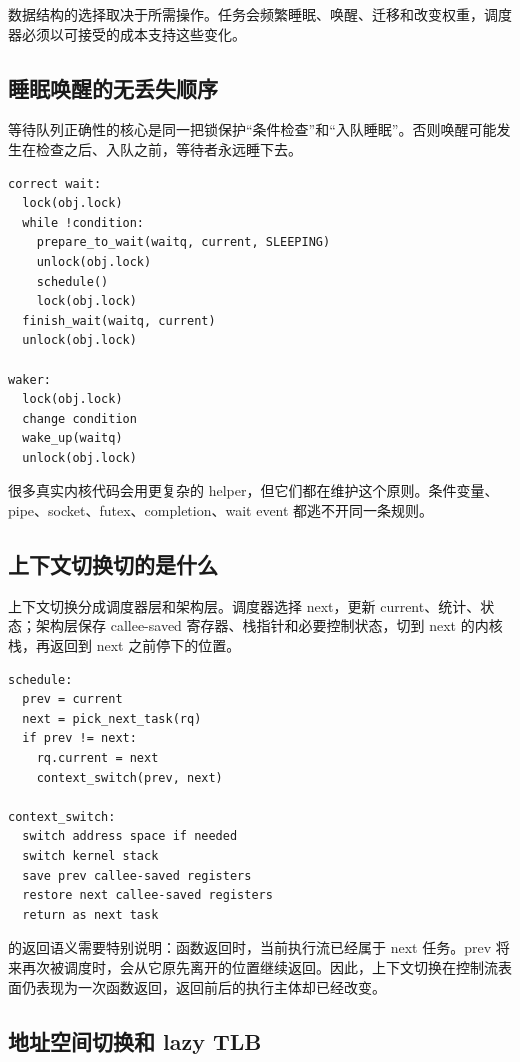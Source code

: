 数据结构的选择取决于所需操作。任务会频繁睡眠、唤醒、迁移和改变权重，调度器必须以可接受的成本支持这些变化。

\subsection{睡眠唤醒的无丢失顺序}

等待队列正确性的核心是同一把锁保护“条件检查”和“入队睡眠”。否则唤醒可能发生在检查之后、入队之前，等待者永远睡下去。

\begin{lstlisting}
correct wait:
  lock(obj.lock)
  while !condition:
    prepare_to_wait(waitq, current, SLEEPING)
    unlock(obj.lock)
    schedule()
    lock(obj.lock)
  finish_wait(waitq, current)
  unlock(obj.lock)

waker:
  lock(obj.lock)
  change condition
  wake_up(waitq)
  unlock(obj.lock)
\end{lstlisting}

很多真实内核代码会用更复杂的 helper，但它们都在维护这个原则。条件变量、pipe、socket、futex、completion、wait event 都逃不开同一条规则。

\subsection{上下文切换切的是什么}

上下文切换分成调度器层和架构层。调度器选择 next，更新 current、统计、状态；架构层保存 callee-saved 寄存器、栈指针和必要控制状态，切到 next 的内核栈，再返回到 next 之前停下的位置。

\begin{lstlisting}
schedule:
  prev = current
  next = pick_next_task(rq)
  if prev != next:
    rq.current = next
    context_switch(prev, next)

context_switch:
  switch address space if needed
  switch kernel stack
  save prev callee-saved registers
  restore next callee-saved registers
  return as next task
\end{lstlisting}

 的返回语义需要特别说明：函数返回时，当前执行流已经属于 next 任务。prev 将来再次被调度时，会从它原先离开的位置继续返回。因此，上下文切换在控制流表面仍表现为一次函数返回，返回前后的执行主体却已经改变。

\subsection{地址空间切换和 lazy TLB}

